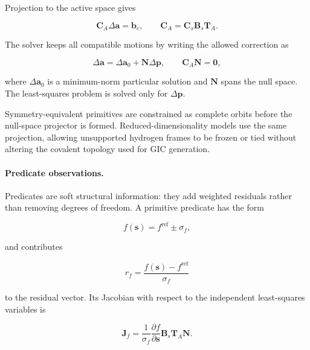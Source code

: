 \documentclass[aip,jcp,reprint,longbibliography,floatfix]{revtex4-2}
\begin{document}
Projection to the active space gives

\begin{equation}
\mathbf{C}_{A}
\Delta\mathbf{a}
=
\mathbf{b}_c,
\qquad
\mathbf{C}_{A}
=
\mathbf{C}_s
\mathbf{B}_s
\mathbf{T}_{A}.
\end{equation}

The solver keeps all compatible motions by writing the allowed correction as

\begin{equation}
\Delta\mathbf{a}
=
\Delta\mathbf{a}_0
+
\mathbf{N}\Delta\mathbf{p},
\qquad
\mathbf{C}_{A}\mathbf{N}=\mathbf{0},
\end{equation}

where $\Delta\mathbf{a}_0$ is a minimum-norm particular solution and
$\mathbf{N}$ spans the null space. The least-squares problem is solved only
for $\Delta\mathbf{p}$.

Symmetry-equivalent primitives are constrained as complete orbits before the
null-space projector is formed. Reduced-dimensionality models use the same projection,
allowing unsupported hydrogen frames to be frozen or tied without altering the covalent topology
used for GIC generation.

\paragraph{Predicate observations.}

Predicates are soft structural information: they add weighted residuals rather
than removing degrees of freedom.\cite{Bartell1975Predicate} A primitive
predicate has the form

\begin{equation}
f(\mathbf{s})
=
f^{\mathrm{ref}}
\pm
\sigma_f ,
\end{equation}

and contributes

\begin{equation}
r_f
=
\frac{f(\mathbf{s})-f^{\mathrm{ref}}}{\sigma_f}
\end{equation}

to the residual vector. Its Jacobian with respect to the independent
least-squares variables is

\begin{equation}
\mathbf{J}_f
=
\frac{1}{\sigma_f}
\frac{\partial f}{\partial\mathbf{s}}
\mathbf{B}_s
\mathbf{T}_{A}
\mathbf{N}.
\end{equation}
\end{document}
